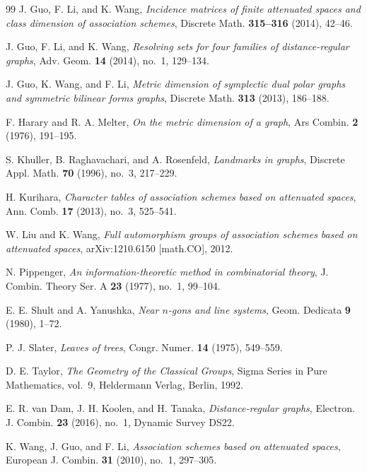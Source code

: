\documentclass[11pt]{article}
\theoremstyle{definition}
\theoremstyle{remark}
\begin{document}
\begin{thebibliography}{99}
J. Guo, F. Li, and K. Wang,
\emph{Incidence matrices of finite attenuated spaces and class dimension
of association schemes},
Discrete Math. \textbf{315--316} (2014), 42--46.

J. Guo, F. Li, and K. Wang,
\emph{Resolving sets for four families of distance-regular graphs},
Adv. Geom. \textbf{14} (2014), no.~1, 129--134.

J. Guo, K. Wang, and F. Li,
\emph{Metric dimension of symplectic dual polar graphs and symmetric
bilinear forms graphs},
Discrete Math. \textbf{313} (2013), 186--188.

F. Harary and R. A. Melter,
\emph{On the metric dimension of a graph},
Ars Combin. \textbf{2} (1976), 191--195.

S. Khuller, B. Raghavachari, and A. Rosenfeld,
\emph{Landmarks in graphs},
Discrete Appl. Math. \textbf{70} (1996), no.~3, 217--229.

H. Kurihara,
\emph{Character tables of association schemes based on attenuated spaces},
Ann. Comb. \textbf{17} (2013), no.~3, 525--541.

W. Liu and K. Wang,
\emph{Full automorphism groups of association schemes based on attenuated
spaces},
arXiv:1210.6150 [math.CO], 2012.

N. Pippenger,
\emph{An information-theoretic method in combinatorial theory},
J. Combin. Theory Ser. A \textbf{23} (1977), no.~1, 99--104.

E. E. Shult and A. Yanushka,
\emph{Near \(n\)-gons and line systems},
Geom. Dedicata \textbf{9} (1980), 1--72.

P. J. Slater,
\emph{Leaves of trees},
Congr. Numer. \textbf{14} (1975), 549--559.

D. E. Taylor,
\emph{The Geometry of the Classical Groups},
Sigma Series in Pure Mathematics, vol.~9,
Heldermann Verlag, Berlin, 1992.

E. R. van Dam, J. H. Koolen, and H. Tanaka,
\emph{Distance-regular graphs},
Electron. J. Combin. \textbf{23} (2016), no.~1, Dynamic Survey DS22.

K. Wang, J. Guo, and F. Li,
\emph{Association schemes based on attenuated spaces},
European J. Combin. \textbf{31} (2010), no.~1, 297--305.

\end{thebibliography}
\end{document}
